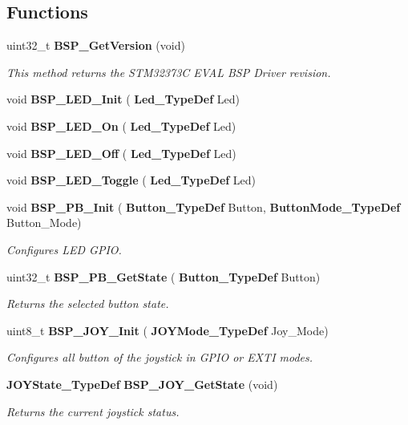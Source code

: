 \subsection*{Functions}
\begin{DoxyCompactItemize}
\item 
uint32\+\_\+t \textbf{ B\+S\+P\+\_\+\+Get\+Version} (void)
\begin{DoxyCompactList}\small\item\em This method returns the S\+T\+M32373C E\+V\+AL B\+SP Driver revision. \end{DoxyCompactList}\item 
void \textbf{ B\+S\+P\+\_\+\+L\+E\+D\+\_\+\+Init} (\textbf{ Led\+\_\+\+Type\+Def} Led)
\item 
void \textbf{ B\+S\+P\+\_\+\+L\+E\+D\+\_\+\+On} (\textbf{ Led\+\_\+\+Type\+Def} Led)
\item 
void \textbf{ B\+S\+P\+\_\+\+L\+E\+D\+\_\+\+Off} (\textbf{ Led\+\_\+\+Type\+Def} Led)
\item 
void \textbf{ B\+S\+P\+\_\+\+L\+E\+D\+\_\+\+Toggle} (\textbf{ Led\+\_\+\+Type\+Def} Led)
\item 
void \textbf{ B\+S\+P\+\_\+\+P\+B\+\_\+\+Init} (\textbf{ Button\+\_\+\+Type\+Def} Button, \textbf{ Button\+Mode\+\_\+\+Type\+Def} Button\+\_\+\+Mode)
\begin{DoxyCompactList}\small\item\em Configures L\+ED G\+P\+IO. \end{DoxyCompactList}\item 
uint32\+\_\+t \textbf{ B\+S\+P\+\_\+\+P\+B\+\_\+\+Get\+State} (\textbf{ Button\+\_\+\+Type\+Def} Button)
\begin{DoxyCompactList}\small\item\em Returns the selected button state. \end{DoxyCompactList}\item 
uint8\+\_\+t \textbf{ B\+S\+P\+\_\+\+J\+O\+Y\+\_\+\+Init} (\textbf{ J\+O\+Y\+Mode\+\_\+\+Type\+Def} Joy\+\_\+\+Mode)
\begin{DoxyCompactList}\small\item\em Configures all button of the joystick in G\+P\+IO or E\+X\+TI modes. \end{DoxyCompactList}\item 
\textbf{ J\+O\+Y\+State\+\_\+\+Type\+Def} \textbf{ B\+S\+P\+\_\+\+J\+O\+Y\+\_\+\+Get\+State} (void)
\begin{DoxyCompactList}\small\item\em Returns the current joystick status. \end{DoxyCompactList}\end{DoxyCompactItemize}


